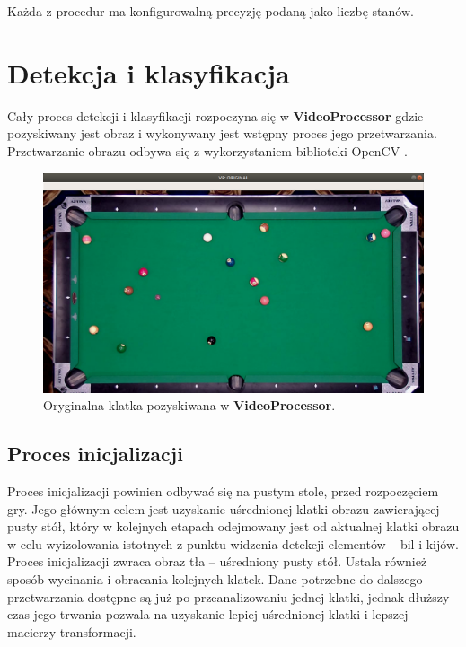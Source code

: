 \documentclass[12pt]{article}
\begin{document}
Każda z procedur ma konfigurowalną precyzję podaną jako liczbę stanów.

\section{Detekcja i klasyfikacja}

Cały proces detekcji i klasyfikacji rozpoczyna się w \textbf{VideoProcessor} gdzie pozyskiwany jest obraz i wykonywany jest wstępny proces jego przetwarzania. Przetwarzanie obrazu odbywa się z wykorzystaniem biblioteki OpenCV \cite{OpenCV}.

\begin{figure}[!htb]
    \centering
    \includegraphics[width=15cm]{./images/obrazki/vp/original.png}
    \caption{Oryginalna klatka pozyskiwana w \textbf{VideoProcessor}.}
    \label{vp_original}
\end{figure}

\subsection{Proces inicjalizacji}

Proces inicjalizacji powinien odbywać się na pustym stole, przed rozpoczęciem gry. Jego głównym celem jest uzyskanie uśrednionej klatki obrazu zawierającej pusty stół, który w kolejnych etapach odejmowany jest od aktualnej klatki obrazu w celu wyizolowania istotnych z punktu widzenia detekcji elementów – bil i kijów. Proces inicjalizacji zwraca obraz tła – uśredniony pusty stół. Ustala również sposób wycinania i obracania kolejnych klatek. Dane potrzebne do dalszego przetwarzania dostępne są już po przeanalizowaniu jednej klatki, jednak dłuższy czas jego trwania pozwala na uzyskanie lepiej uśrednionej klatki i lepszej macierzy transformacji. 
\clearpage
\end{document}
